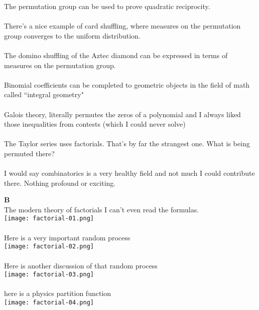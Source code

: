\documentclass[12pt]{article}
\begin{document}
\newpage


The permutation group can be used to prove quadratic reciprocity. \\ \\
There's a nice example of card shuffling, where measures on the permutation group converges to the uniform distribution. \\ \\
The domino shuffling of the Aztec diamond can be expressed in terms of measures on the permutation group. \\ \\
Binomial coefficients can be completed to geometric objects in the field of math called ``integral geometry" \\ \\
Galois theory, literally permutes the zeros of a polynomial and I always liked those inequalities from contests (which I could never solve)\\ \\
The Taylor series uses factorials.  That's by far the strangest one.  What is being permuted there? \\ \\
I would say combinatorics is a very healthy field and not much I could contribute there.  Nothing profound or exciting.

\newpage

\noindent \textbf{B}  \\
The modern theory of factorials I can't even read the formulas. \\
\texttt{[image: factorial-01.png]} \\ \\
Here is a very important random process \\
\texttt{[image: factorial-02.png]} \\ \\ 
Here is another discussion of that random process \\ 
\texttt{[image: factorial-03.png]} \\ \\
here is a physics partition function \\ 
\texttt{[image: factorial-04.png]} 

\newpage
\end{document}
